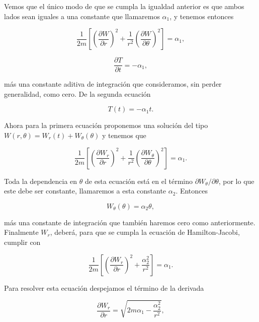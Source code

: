 \documentclass[a4paper,10pt]{article}
\numberwithin{equation}{section}
\begin{document}
Vemos que el único modo de que se cumpla la igualdad anterior es que 
ambos lados sean iguales a una constante que llamaremos $\alpha_1$, y tenemos entonces

\begin{equation}
 \frac{1}{2m}\left[\left(\frac{\partial W}{\partial r} \right)^2 
 + \frac{1}{r^2}\left( \frac{\partial W}{\partial \theta}\right)^2\right] = 
 \alpha_1,
\end{equation}

\begin{equation}
 \frac{\partial T}{\partial t} = - \alpha_1,
\end{equation}

más una constante aditiva de integración que consideramos, sin perder generalidad,
como cero. De la segunda ecuación

\begin{equation}
 T(t) = - \alpha_1t.
\end{equation}

Ahora para la primera ecuación proponemos una solución del tipo $W(r,\theta) = 
W_r(t) + W_\theta(\theta)$ y tenemos que 

\begin{equation}
 \frac{1}{2m}\left[\left(\frac{\partial W_r}{\partial r} \right)^2 
 + \frac{1}{r^2}\left( \frac{\partial W_\theta}{\partial \theta}\right)^2\right] = 
 \alpha_1.
\end{equation}

Toda la dependencia en $\theta$ de esta ecuación está en el término 
$\partial W_\theta/\partial \theta$, por lo que este debe ser constante, llamaremos 
a esta constante $\alpha_2$. Entonces 

\begin{equation}
 W_\theta (\theta) = \alpha_2 \theta,
\end{equation}

más una constante de integración que también haremos cero como anteriormente. Finalmente 
$W_r$, deberá, para que se cumpla la ecuación de Hamilton-Jacobi, cumplir con 

\begin{equation}
  \frac{1}{2m}\left[\left(\frac{\partial W_r}{\partial r} \right)^2 
 + \frac{\alpha_2^2}{r^2}\right] = 
 \alpha_1.
\end{equation}

Para resolver esta ecuación despejamos el término de la derivada 

\begin{equation}
 \frac{\partial W_r}{\partial r} = \sqrt{2m\alpha_1 - \frac{\alpha_2^2}{r^2}},
\end{equation}
\end{document}
